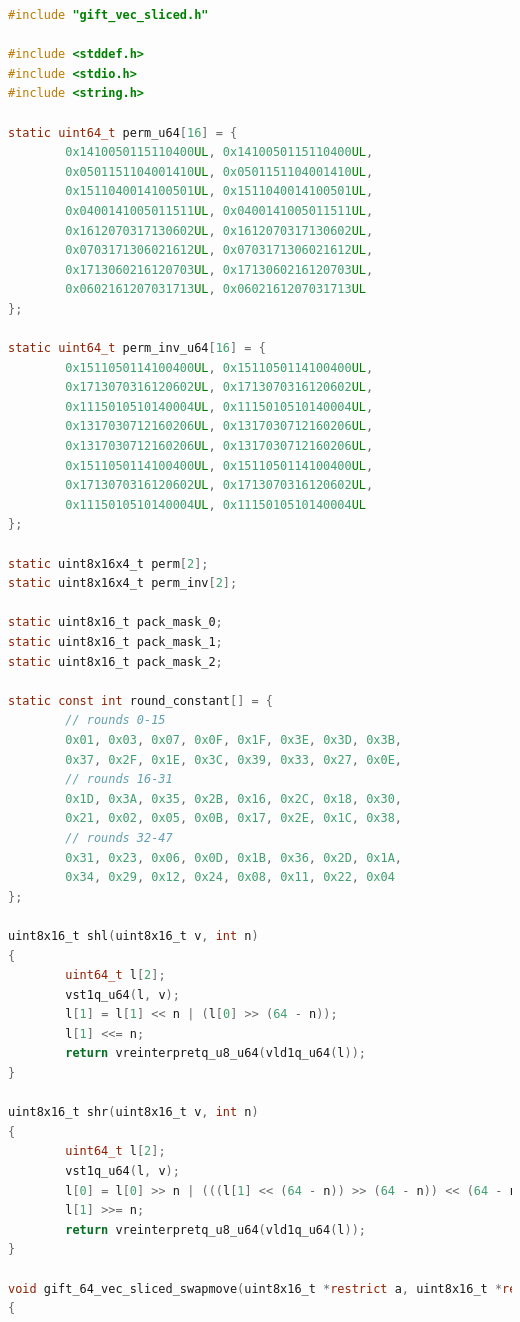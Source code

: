 \documentclass[12pt]{report}
\begin{document}
\begin{lstlisting}[language=c, caption={gift\_vec\_sliced.c}]
#include "gift_vec_sliced.h"

#include <stddef.h>
#include <stdio.h>
#include <string.h>

static uint64_t perm_u64[16] = {
        0x1410050115110400UL, 0x1410050115110400UL,
        0x0501151104001410UL, 0x0501151104001410UL,
        0x1511040014100501UL, 0x1511040014100501UL,
        0x0400141005011511UL, 0x0400141005011511UL,
        0x1612070317130602UL, 0x1612070317130602UL,
        0x0703171306021612UL, 0x0703171306021612UL,
        0x1713060216120703UL, 0x1713060216120703UL,
        0x0602161207031713UL, 0x0602161207031713UL
};

static uint64_t perm_inv_u64[16] = {
        0x1511050114100400UL, 0x1511050114100400UL,
        0x1713070316120602UL, 0x1713070316120602UL,
        0x1115010510140004UL, 0x1115010510140004UL,
        0x1317030712160206UL, 0x1317030712160206UL,
        0x1317030712160206UL, 0x1317030712160206UL,
        0x1511050114100400UL, 0x1511050114100400UL,
        0x1713070316120602UL, 0x1713070316120602UL,
        0x1115010510140004UL, 0x1115010510140004UL
};

static uint8x16x4_t perm[2];
static uint8x16x4_t perm_inv[2];

static uint8x16_t pack_mask_0;
static uint8x16_t pack_mask_1;
static uint8x16_t pack_mask_2;

static const int round_constant[] = {
        // rounds 0-15
        0x01, 0x03, 0x07, 0x0F, 0x1F, 0x3E, 0x3D, 0x3B,
        0x37, 0x2F, 0x1E, 0x3C, 0x39, 0x33, 0x27, 0x0E,
        // rounds 16-31
        0x1D, 0x3A, 0x35, 0x2B, 0x16, 0x2C, 0x18, 0x30,
        0x21, 0x02, 0x05, 0x0B, 0x17, 0x2E, 0x1C, 0x38,
        // rounds 32-47
        0x31, 0x23, 0x06, 0x0D, 0x1B, 0x36, 0x2D, 0x1A,
        0x34, 0x29, 0x12, 0x24, 0x08, 0x11, 0x22, 0x04
};

uint8x16_t shl(uint8x16_t v, int n)
{
        uint64_t l[2];
        vst1q_u64(l, v);
        l[1] = l[1] << n | (l[0] >> (64 - n));
        l[1] <<= n;
        return vreinterpretq_u8_u64(vld1q_u64(l));
}

uint8x16_t shr(uint8x16_t v, int n)
{
        uint64_t l[2];
        vst1q_u64(l, v);
        l[0] = l[0] >> n | (((l[1] << (64 - n)) >> (64 - n)) << (64 - n));
        l[1] >>= n;
        return vreinterpretq_u8_u64(vld1q_u64(l));
}

void gift_64_vec_sliced_swapmove(uint8x16_t *restrict a, uint8x16_t *restrict b, uint8x16_t m, int n)
{


\end{lstlisting}
\end{document}
